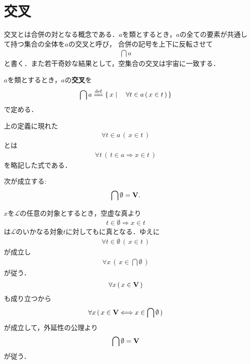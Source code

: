 \section{交叉}
	交叉とは合併の対となる概念である．$a$を類とするとき，$a$の全ての要素が共通して持つ集合の全体を$a$の交叉と呼び，
	合併の記号を上下に反転させて
	\begin{align}
		\bigcap a
	\end{align}
	と書く．また若干奇妙な結果として，空集合の交叉は宇宙に一致する．
	
	\begin{screen}
		\begin{dfn}[交叉]
			$a$を類とするとき，$a$の{\bf 交叉}を
			\begin{align}
				\bigcap a \defeq \Set{x}{\forall t \in a\, (\, x \in t\, )}
			\end{align}
			で定める．
		\end{dfn}
	\end{screen}
	
	上の定義に現れた
	\begin{align}
		\forall t \in a\, (\, x \in t\, )
	\end{align}
	とは
	\begin{align}
		\forall t\, (\, t \in a \Longrightarrow x \in t\, )
	\end{align}
	を略記した式である．
	
	\begin{screen}
		\begin{thm}[空集合の交叉は宇宙となる]\label{thm:union_of_the_emptyset_is_the_Universe}
			次が成立する:
			\begin{align}
				\bigcap \emptyset = \mathbf{V}.
			\end{align}
		\end{thm}
	\end{screen}
	
	\begin{prf}
		$x$を$\mathcal{L}$の任意の対象とするとき，空虚な真より
		\begin{align}
			t \in \emptyset \Longrightarrow x \in t
		\end{align}
		は$\mathcal{L}$のいかなる対象$t$に対してもに真となる．ゆえに
		\begin{align}
			\forall t \in \emptyset\, (\, x \in t\, )
		\end{align}
		が成立し
		\begin{align}
			\forall x\, (\, x \in \bigcap \emptyset\, )
		\end{align}
		が従う．
		\begin{align}
			\forall x\, (\, x \in \mathbf{V}\, )
		\end{align}
		も成り立つから
		\begin{align}
			\forall x\, (\, x \in \mathbf{V} \Longleftrightarrow x \in \bigcap \emptyset\, )
		\end{align}
		が成立して，外延性の公理より
		\begin{align}
			\bigcap \emptyset = \mathbf{V}
		\end{align}
		が従う．
		\QED
	\end{prf}
	
